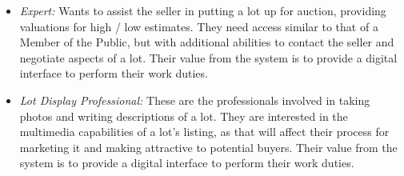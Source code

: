 \documentclass[titlepage, 12pt]{extarticle}
\begin{document}
\begin{itemize}
\item {\it Expert:} Wants to assist the seller in putting a lot up for auction, providing valuations for high / low estimates. They need access similar to that of a Member of the Public, but with additional abilities to contact the seller and negotiate aspects of a lot. Their value from the system is to provide a digital interface to perform their work duties. 
\item {\it Lot Display Professional:} These are the professionals involved in taking photos and writing descriptions of a lot. They are interested in the multimedia capabilities of a lot's listing, as that will affect their process for marketing it and making attractive to potential buyers. Their value from the system is to provide a digital interface to perform their work duties. 
\end{itemize}
\end{document}
